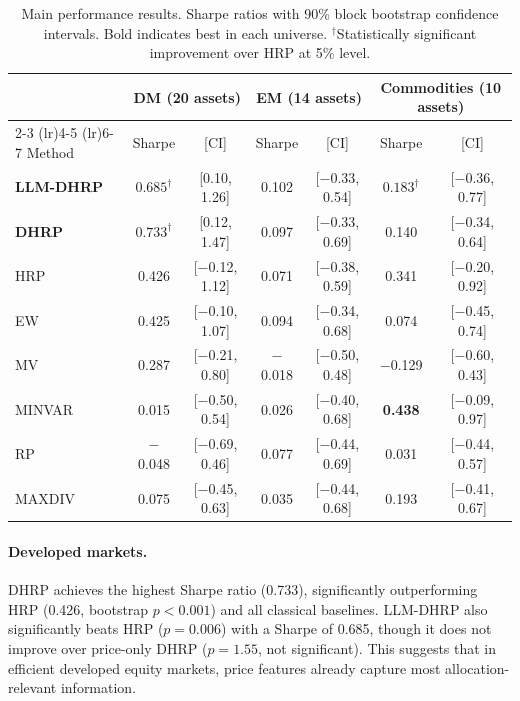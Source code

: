 \documentclass[11pt]{article}
\begin{document}
\begin{table}[t]
\centering
\caption{Main performance results. Sharpe ratios with 90\% block bootstrap confidence intervals. Bold indicates best in each universe. $^\dagger$Statistically significant improvement over HRP at 5\% level.}
\label{tab:main}
\small
\begin{tabular}{lcccccc}
\toprule
& \multicolumn{2}{c}{\textbf{DM (20 assets)}} & \multicolumn{2}{c}{\textbf{EM (14 assets)}} & \multicolumn{2}{c}{\textbf{Commodities (10 assets)}} \\
\cmidrule(lr){2-3} \cmidrule(lr){4-5} \cmidrule(lr){6-7}
Method & Sharpe & [CI] & Sharpe & [CI] & Sharpe & [CI] \\
\midrule
\textbf{LLM-DHRP} & $0.685^\dagger$ & [0.10, 1.26] & 0.102 & [$-$0.33, 0.54] & $\mathbf{0.183}^\dagger$ & [$-$0.36, 0.77] \\
\textbf{DHRP} & $\mathbf{0.733}^\dagger$ & [0.12, 1.47] & 0.097 & [$-$0.33, 0.69] & 0.140 & [$-$0.34, 0.64] \\
HRP & 0.426 & [$-$0.12, 1.12] & 0.071 & [$-$0.38, 0.59] & 0.341 & [$-$0.20, 0.92] \\
EW & 0.425 & [$-$0.10, 1.07] & 0.094 & [$-$0.34, 0.68] & 0.074 & [$-$0.45, 0.74] \\
MV & 0.287 & [$-$0.21, 0.80] & $-$0.018 & [$-$0.50, 0.48] & $-$0.129 & [$-$0.60, 0.43] \\
MINVAR & 0.015 & [$-$0.50, 0.54] & 0.026 & [$-$0.40, 0.68] & \textbf{0.438} & [$-$0.09, 0.97] \\
RP & $-$0.048 & [$-$0.69, 0.46] & 0.077 & [$-$0.44, 0.69] & 0.031 & [$-$0.44, 0.57] \\
MAXDIV & 0.075 & [$-$0.45, 0.63] & 0.035 & [$-$0.44, 0.68] & 0.193 & [$-$0.41, 0.67] \\
\bottomrule
\end{tabular}
\end{table}

\paragraph{Developed markets.} DHRP achieves the highest Sharpe ratio (0.733), significantly outperforming HRP (0.426, bootstrap $p < 0.001$) and all classical baselines. LLM-DHRP also significantly beats HRP ($p = 0.006$) with a Sharpe of 0.685, though it does not improve over price-only DHRP ($p = 1.55$, not significant). This suggests that in efficient developed equity markets, price features already capture most allocation-relevant information.
\end{document}
